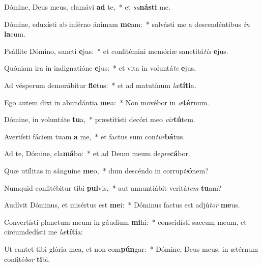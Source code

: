 \item Dómine, Deus meus, clamávi \textbf{ad} te,~* et \textit{sa}\textbf{nás}\textbf{ti} me.
\item Dómine, eduxísti ab inférno ánimam \textbf{me}am:~* salvásti me a descendéntibus \textit{in} \textbf{la}cum.
\item Psállite Dómino, sancti \textbf{e}jus:~* et confitémini memóriæ sanctitá\textit{tis} \textbf{e}jus.
\item Quóniam ira in indignatióne \textbf{e}jus:~* et vita in voluntá\textit{te} \textbf{e}jus.
\item Ad vésperum demorábitur \textbf{fle}tus:~* et ad matutínum \textit{læ}\textbf{tí}\textbf{ti}a.
\item Ego autem dixi in abundántia \textbf{me}a:~* Non movébor in \textit{æ}\textbf{tér}num.
\item Dómine, in voluntáte \textbf{tu}a,~* præstitísti decóri meo \textit{vir}\textbf{tú}tem.
\item Avertísti fáciem tuam \textbf{a} me,~* et factus sum con\textit{tur}\textbf{bá}tus.
\item Ad te, Dómine, cla\textbf{má}bo:~* et ad Deum meum de\textit{pre}\textbf{cá}bor.
\item Quæ utílitas in sánguine \textbf{me}o,~* dum descéndo in corrup\textit{ti}\textbf{ó}nem?
\item Numquid confitébitur tibi \textbf{pul}vis,~* aut annuntiábit veritá\textit{tem} \textbf{tu}am?
\item Audívit Dóminus, et misértus est \textbf{me}i:~* Dóminus factus est adjú\textit{tor} \textbf{me}us.
\item Convertísti planctum meum in gáudium \textbf{mi}hi:~* conscidísti saccum meum, et circumdedísti me \textit{læ}\textbf{tí}\textbf{ti}a:
\item Ut cantet tibi glória mea, et non com\textbf{pún}gar:~* Dómine, Deus meus, in ætérnum confité\textit{bor} \textbf{ti}bi.
